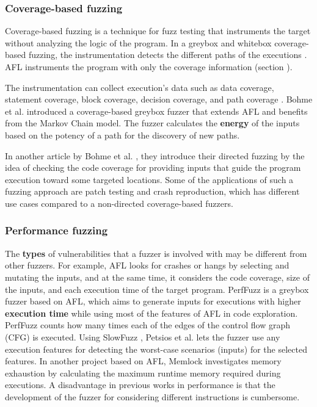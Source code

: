 \subsubsection{Coverage-based fuzzing}

Coverage-based fuzzing is a technique for fuzz testing that instruments the target without analyzing the logic of the program. In a greybox and whitebox coverage-based fuzzing, the instrumentation detects the different paths of the executions \cite{liang2018fuzzing}. AFL instruments the program with only the coverage information (section ).

The instrumentation can collect execution's data such as data coverage, statement coverage, block coverage, decision coverage, and path coverage \cite{yang2009survey}. Bohme et al. \cite{bohme2017coverage} introduced a coverage-based greybox fuzzer that extends AFL and benefits from the Markov Chain model. The fuzzer calculates the \textbf{energy} of the inputs based on the potency of a path for the discovery of new paths.

In another article by Bohme et al. \cite{bohme2017directed}, they introduce their directed fuzzing by the idea of checking the code coverage for providing inputs that guide the program execution toward some targeted locations. Some of the applications of such a fuzzing approach are patch testing and crash reproduction, which has different use cases compared to a non-directed coverage-based fuzzers.

\subsubsection{Performance fuzzing}

The \textbf{types} of vulnerabilities that a fuzzer is involved with may be different from other fuzzers. For example, AFL looks for crashes or hangs by selecting and mutating the inputs, and at the same time, it considers the code coverage, size of the inputs, and each execution time of the target program. PerfFuzz \cite{lemieux2018perffuzz} is a greybox fuzzer based on AFL, which aims to generate inputs for executions with higher \textbf{execution time} while using most of the features of AFL in code exploration. PerfFuzz counts how many times each of the edges of the control flow graph (CFG) is executed. Using SlowFuzz \cite{petsios2017slowfuzz}, Petsios et al. lets the fuzzer use any execution features for detecting the worst-case scenarios (inputs) for the selected features. In another project based on AFL, Memlock \cite{wen2020memlock} investigates memory exhaustion by calculating the maximum runtime memory required during executions. A disadvantage in previous works in performance is that the development of the fuzzer for considering different instructions is cumbersome.

\vspace{1.5\baselineskip}
